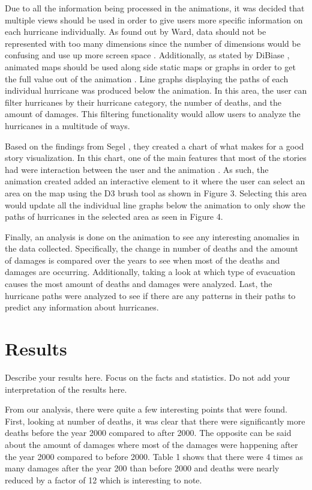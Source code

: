 \bars

Due to all the information being processed in the animations, it was decided that multiple views should be used in order to give users more specific information on each hurricane individually. As found out by Ward, data should not be represented with too many dimensions since the number of dimensions would be confusing and use up more screen space \cite{ward1994xmdvtool}. Additionally, as stated by DiBiase \etal, animated maps should be used along side static maps or graphs in order to get the full value out of the animation \cite{dibiase1992animation}.  Line graphs displaying the paths of each individual hurricane was produced below the animation. In this area, the user can filter hurricanes by their hurricane category, the number of deaths, and the amount of damages. This filtering functionality would allow users to analyze the hurricanes in a multitude of ways. 

Based on the findings from Segel \etal, they created a chart of what makes for a good story visualization. In this chart, one of the main features that most of the stories had were interaction between the user and the animation \cite{segel2010narrative}. As such, the animation created added an interactive element to it where the user can select an area on the map using the D3 brush tool as shown in Figure 3. Selecting this area would update all the individual line graphs below the animation to only show the paths of hurricanes in the selected area as seen in Figure 4. 

\brush
\multipleViews

Finally, an analysis is done on the animation to see any interesting anomalies in the data collected. Specifically, the change in number of deaths and the amount of damages is compared over the years to see when most of the deaths and damages are occurring. Additionally, taking a look at which type of evacuation causes the most amount of deaths and damages were analyzed. Last, the hurricane paths were analyzed to see if there are any patterns in their paths to predict any information about hurricanes. 

\section{Results}
Describe your results here. Focus on the facts and statistics. Do not add your interpretation of the results here.

From our analysis, there were quite a few interesting points that were found. First, looking at number of deaths, it was clear that there were significantly more deaths before the year 2000 compared to after 2000. The opposite can be said about the amount of damages where most of the damages were happening after the year 2000 compared to before 2000. Table 1 shows that there were 4 times as many damages after the year 200 than before 2000 and deaths were nearly reduced by a factor of 12 which is interesting to note.

